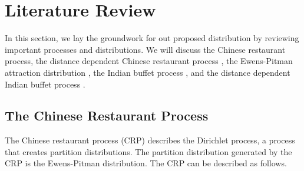 

\chapter{Literature Review} %
In this section, we lay the groundwork for out proposed distribution by reviewing
important processes and distributions. We will discuss the Chinese restaurant
process, the distance dependent Chinese restaurant process \citep{ddcrp}, the
Ewens-Pitman attraction distribution \citep{epa}, the Indian buffet process
\citep{ibp}, and the distance dependent Indian buffet process \citep{ddibp}.

\section{The Chinese Restaurant Process}
The Chinese restaurant process (CRP) describes the Dirichlet process, a process
that creates partition distributions. The partition distribution generated by the 
CRP is the Ewens-Pitman distribution. The CRP can be described as follows.\\

